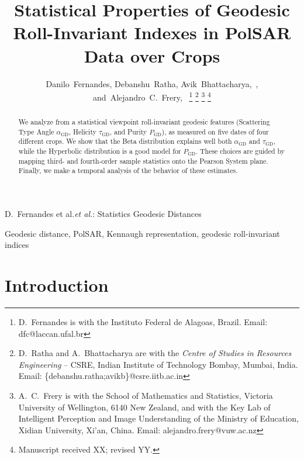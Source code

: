 \documentclass[journal]{IEEEtran}
\begin{document}
\title{Statistical Properties of Geodesic Roll-Invariant Indexes in PolSAR Data over Crops}

\author{Danilo~Fernandes,
	Debanshu~Ratha,
	Avik~Bhattacharya,~,
	and~Alejandro~C.~Frery,~%
	\thanks{D.\ Fernandes is with the Instituto Federal de Alagoas, Brazil. Email: dfc@laccan.ufal.br}%
	\thanks{D.\ Ratha and A.\ Bhattacharya are with the \textit{Centre of Studies in Resources Engineering}
		-- CSRE, Indian Institute of Technology Bombay, Mumbai, India. Email: \{debanshu.ratha;avikb\}@csre.iitb.ac.in}%
	\thanks{A.\ C.\ Frery is with the School of Mathematics and Statistics, Victoria University of Wellington, 6140 New Zealand, and with the Key Lab of Intelligent Perception and Image Understanding of the Ministry of Education, Xidian University, Xi'an, China. Email: alejandro.frery@vuw.ac.nz}
	\thanks{Manuscript received XX; revised YY.}}

%
{D.\ Fernandes et al.\MakeLowercase{\textit{et al.}}: Statistics Geodesic Distances}

\maketitle

\begin{abstract}
We analyze from a statistical viewpoint roll-invariant geodesic features (Scattering Type Angle $\alpha_{\text{GD}}$, Helicity $\tau_{\text{GD}}$, and Purity $P_{\text{GD}}$), as measured on five dates of four different crops.
We show that the Beta distribution explains well both $\alpha_{\text{GD}}$ and $\tau_{\text{GD}}$, while the Hyperbolic distribution is a good model for $P_{\text{GD}}$.
These choices are guided by mapping third- and fourth-order sample statistics onto the Pearson System plane.
Finally, we make a temporal analysis of the behavior of these estimates.
\end{abstract}

\begin{IEEEkeywords}
	Geodesic distance, PolSAR, Kennaugh representation, geodesic roll-invariant indices
\end{IEEEkeywords}

\IEEEpeerreviewmaketitle

\section{Introduction}
\end{document}
